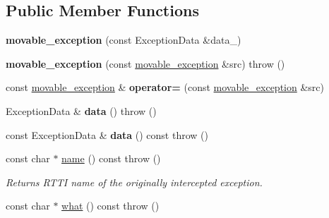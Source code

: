 \subsection*{Public Member Functions}
\begin{DoxyCompactItemize}
\item 
\hypertarget{classtbb_1_1movable__exception_a785b749022a1e6a7486d315b84bd37e5}{}{\bfseries movable\+\_\+exception} (const Exception\+Data \&data\+\_\+)\label{classtbb_1_1movable__exception_a785b749022a1e6a7486d315b84bd37e5}

\item 
\hypertarget{classtbb_1_1movable__exception_a7be7103edd861653baebbca5aeed5205}{}{\bfseries movable\+\_\+exception} (const \hyperlink{classtbb_1_1movable__exception}{movable\+\_\+exception} \&src)  throw ()\label{classtbb_1_1movable__exception_a7be7103edd861653baebbca5aeed5205}

\item 
\hypertarget{classtbb_1_1movable__exception_a35a4bf997b56ea221ae1bd9bb17cd33b}{}const \hyperlink{classtbb_1_1movable__exception}{movable\+\_\+exception} \& {\bfseries operator=} (const \hyperlink{classtbb_1_1movable__exception}{movable\+\_\+exception} \&src)\label{classtbb_1_1movable__exception_a35a4bf997b56ea221ae1bd9bb17cd33b}

\item 
\hypertarget{classtbb_1_1movable__exception_a4eac52bc2a10d4bfcd74ad85c2853740}{}Exception\+Data \& {\bfseries data} ()  throw ()\label{classtbb_1_1movable__exception_a4eac52bc2a10d4bfcd74ad85c2853740}

\item 
\hypertarget{classtbb_1_1movable__exception_a394c11a07cfcd4977327f58362aa1439}{}const Exception\+Data \& {\bfseries data} () const   throw ()\label{classtbb_1_1movable__exception_a394c11a07cfcd4977327f58362aa1439}

\item 
\hypertarget{classtbb_1_1movable__exception_a65dd805ed2424f1d2d0998f5567a9690}{}const char $\ast$ \hyperlink{classtbb_1_1movable__exception_a65dd805ed2424f1d2d0998f5567a9690}{name} () const   throw ()\label{classtbb_1_1movable__exception_a65dd805ed2424f1d2d0998f5567a9690}

\begin{DoxyCompactList}\small\item\em Returns R\+T\+T\+I name of the originally intercepted exception. \end{DoxyCompactList}\item 
\hypertarget{classtbb_1_1movable__exception_a41a2a7b61537ecd684bae760366f611c}{}const char $\ast$ \hyperlink{classtbb_1_1movable__exception_a41a2a7b61537ecd684bae760366f611c}{what} () const   throw ()\label{classtbb_1_1movable__exception_a41a2a7b61537ecd684bae760366f611c}


\end{DoxyCompactItemize}
